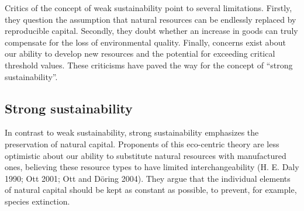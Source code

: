 \documentclass[
  a4paper,
  openany]{book}
\begin{document}
Critics of the concept of weak sustainability point to several
limitations. Firstly, they question the assumption that natural
resources can be endlessly replaced by reproducible capital. Secondly,
they doubt whether an increase in goods can truly compensate for the
loss of environmental quality. Finally, concerns exist about our ability
to develop new resources and the potential for exceeding critical
threshold values. These criticisms have paved the way for the concept of
``strong sustainability''.

\subsection{Strong sustainability}\label{strong-sustainability}

In contrast to weak sustainability, strong sustainability emphasizes the
preservation of natural capital. Proponents of this eco-centric theory
are less optimistic about our ability to substitute natural resources
with manufactured ones, believing these resource types to have limited
interchangeability (H. E. Daly 1990; Ott 2001; Ott and Döring 2004).
They argue that the individual elements of natural capital should be
kept as constant as possible, to prevent, for example, species
extinction.
\end{document}
